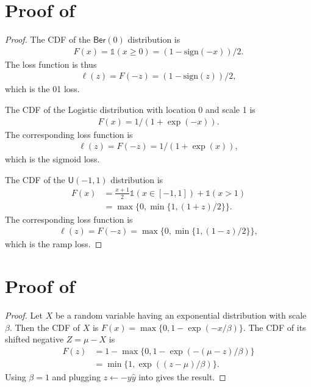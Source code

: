 \documentclass[letterpaper]{article} %
\newcommand{\ber}{{\mathsf{Ber}}}
\newcommand{\I}{\mathds{1}}
\begin{document}
\section{Proof of }
\distloss*
\begin{proof}
    The CDF of the $\ber(0)$ distribution is
    \begin{align*}
        F(x)=\I(x\geq 0)=(1-\mathrm{sign}(-x))/2.
    \end{align*}
    The loss function is thus
    \begin{align*}
        \ell(z)=F(-z)=(1-\mathrm{sign}(z))/2,
    \end{align*}
    which is the 01 loss.

    \medskip
    The CDF of the Logistic distribution with location 0 and scale 1 is
    \begin{align*}
        F(x)=1/(1+\exp(-x)).
    \end{align*}
    The corresponding loss function is
    \begin{align*}
        \ell(z)=F(-z)=1/(1+\exp(x)),
    \end{align*}
    which is the sigmoid loss.

    \medskip
    The CDF of the $\mathsf{U}(-1,1)$ distribution is
    \begin{align*}
        F(x)
        &=\frac{x+1}{2}\I(x\in [-1,1])+\I(x>1) \\
        &=\max\{0,\min\{1,(1+z)/2\}\}.
    \end{align*}
    The corresponding loss function is
    \begin{align*}
        \ell(z)=F(-z)=\max\{0,\min\{1,(1-z)/2\}\},
    \end{align*}
    which is the ramp loss.
\end{proof}

\section{Proof of }
\neloss*
\begin{proof}
    Let $X$ be a random variable having an exponential distribution with scale $\beta$. Then the CDF of $X$ is
    $F(x)=\max\{0,1-\exp(-x/\beta)\}$.
    The CDF of its shifted negative $Z=\mu-X$ is
    \begin{align}
        F(z) &= 1-\max\{0,1-\exp(-(\mu-z)/\beta)\}\nonumber
        \\
        &=\min\{1,\exp((z-\mu)/\beta)\}.\label{eq:ycdf}
    \end{align}
    Using $\beta=1$ and plugging $z \gets -y\hat{y}$ into  gives the result.
\end{proof}
\end{document}
